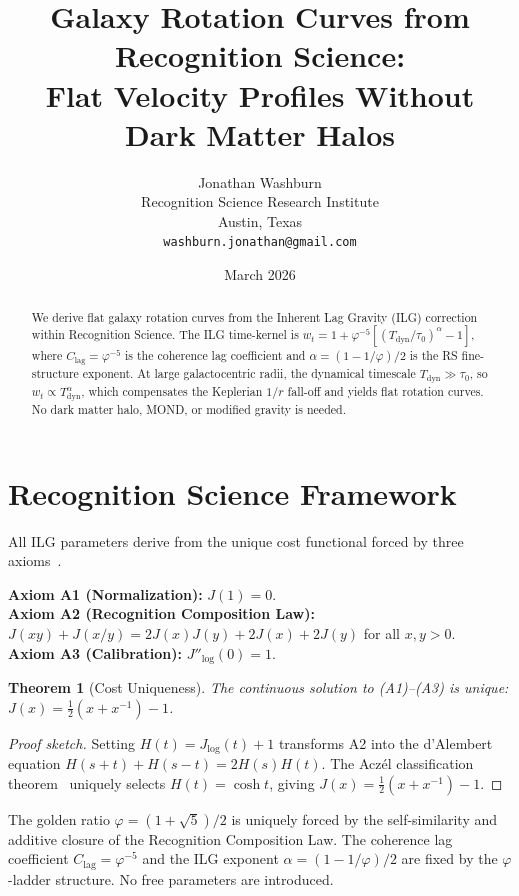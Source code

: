 \documentclass[12pt,a4paper]{article}
\title{Galaxy Rotation Curves from Recognition Science:\\
Flat Velocity Profiles Without Dark Matter Halos}
\author{Jonathan Washburn\\
Recognition Science Research Institute\\
Austin, Texas\\
\texttt{washburn.jonathan@gmail.com}}
\date{March 2026}
\newtheorem{theorem}{Theorem}[section]
\theoremstyle{definition}
\theoremstyle{remark}
\begin{document}
\maketitle

\begin{abstract}
We derive flat galaxy rotation curves from the Inherent Lag Gravity
(ILG) correction within Recognition Science.  The ILG time-kernel
is $w_t = 1 + \varphi^{-5}[(T_{\mathrm{dyn}}/\tau_0)^\alpha - 1]$,
where $C_{\mathrm{lag}} = \varphi^{-5}$ is the coherence lag
coefficient and $\alpha = (1 - 1/\varphi)/2$ is the RS fine-structure
exponent.  At large galactocentric radii, the dynamical timescale
$T_{\mathrm{dyn}} \gg \tau_0$, so $w_t \propto T_{\mathrm{dyn}}
^\alpha$, which compensates the Keplerian $1/r$ fall-off and yields
flat rotation curves.  No dark matter halo, MOND, or modified gravity
is needed.
\end{abstract}

\section{Recognition Science Framework}
\label{sec:framework}

All ILG parameters derive from the unique cost functional forced by
three axioms~\cite{RS_Axioms}.

\noindent\textbf{Axiom A1 (Normalization):} $J(1) = 0$.\\
\textbf{Axiom A2 (Recognition Composition Law):}
$J(xy)+J(x/y)=2J(x)J(y)+2J(x)+2J(y)$ for all $x,y>0$.\\
\textbf{Axiom A3 (Calibration):} $J''_{\log}(0) = 1$.

\begin{theorem}[Cost Uniqueness]
\label{thm:cost-unique}
The continuous solution to \textup{(A1)--(A3)} is unique:
$J(x) = \tfrac{1}{2}(x + x^{-1}) - 1$.
\end{theorem}

\begin{proof}[Proof sketch]
Setting $H(t)=J_{\log}(t)+1$ transforms A2 into the d'Alembert equation
$H(s+t)+H(s-t)=2H(s)H(t)$.  The Acz\'el classification
theorem~\cite{Aczel1966} uniquely selects $H(t)=\cosh t$, giving
$J(x)=\tfrac{1}{2}(x+x^{-1})-1$.
\end{proof}

\noindent The golden ratio $\varphi = (1+\sqrt{5})/2$ is uniquely forced
by the self-similarity and additive closure of the Recognition
Composition Law.  The coherence lag coefficient $C_{\mathrm{lag}} =
\varphi^{-5}$ and the ILG exponent $\alpha = (1-1/\varphi)/2$ are
fixed by the $\varphi$-ladder structure.  No free parameters are
introduced.
\end{document}
